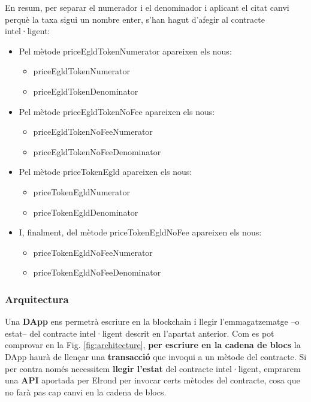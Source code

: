 \documentclass[11pt,a4paper]{article}
\begin{document}
En resum, per separar el numerador i el denominador i aplicant el citat canvi perquè la taxa sigui un nombre enter, s'han hagut d'afegir al contracte intel·ligent:
\begin{itemize}
\item Pel mètode priceEgldTokenNumerator apareixen els nous:
	\begin{itemize}
		\item priceEgldTokenNumerator
		\item priceEgldTokenDenominator
	\end{itemize}
\item Pel mètode priceEgldTokenNoFee apareixen els nous:
	\begin{itemize}
		\item priceEgldTokenNoFeeNumerator
		\item priceEgldTokenNoFeeDenominator
	\end{itemize}	
\item Pel mètode priceTokenEgld apareixen els nous:
	\begin{itemize}
		\item priceTokenEgldNumerator
		\item priceTokenEgldDenominator
	\end{itemize}
\item I, finalment, del mètode priceTokenEgldNoFee apareixen els nous:
	\begin{itemize}
		\item priceTokenEgldNoFeeNumerator
		\item priceTokenEgldNoFeeDenominator
	\end{itemize}		
\end{itemize}

\subsubsection{Arquitectura}\label{subsub:arq}

Una \textbf{DApp} ens permetrà escriure en la blockchain i llegir l'emmagatzematge –o estat– del contracte intel·ligent descrit en l'apartat anterior. Com es pot comprovar en la Fig. \ref{fig:architecture}, \textbf{per escriure en la cadena de blocs} la DApp haurà de llençar una \textbf{transacció} que invoqui a un mètode del contracte. Si per contra només necessitem \textbf{llegir l'estat} del contracte intel·ligent, emprarem una \textbf{API} aportada per Elrond per invocar certs mètodes del contracte, cosa que no farà pas cap canvi en la cadena de blocs.
\end{document}
